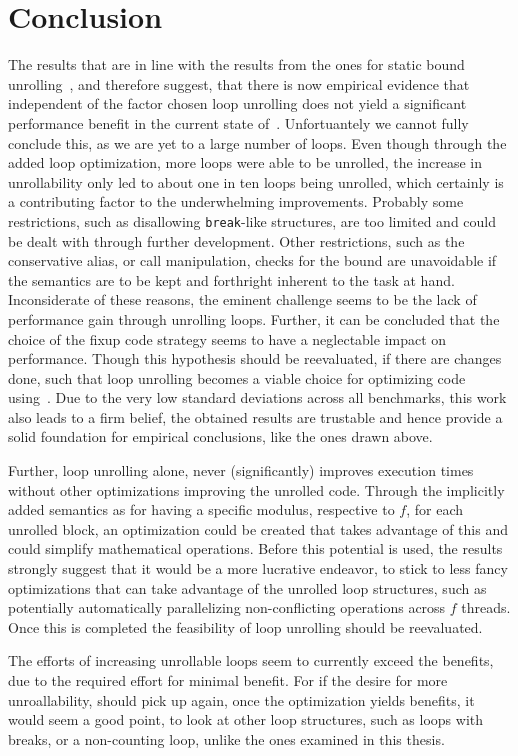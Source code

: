 \chapter{Conclusion}\label{sec:conclusion}

The results that are in line with the results from the ones for static bound unrolling~\cite{aebi18bachelorarbeit}, and therefore suggest, that there is now empirical evidence that independent of the factor chosen loop unrolling does not yield a significant performance benefit in the current state of~\libFIRM.
Unfortuantely we cannot fully conclude this, as we are yet to a large number of loops.
Even though through the added loop optimization, more loops were able to be unrolled, the increase in unrollability only led to about one in ten loops being unrolled, which certainly is a contributing factor to the underwhelming improvements.
Probably some restrictions, such as disallowing \texttt{break}-like structures, are too limited and could be dealt with through further development.
Other restrictions, such as the conservative alias, or call manipulation, checks for the bound are unavoidable if the semantics are to be kept and forthright inherent to the task at hand.
Inconsiderate of these reasons, the eminent challenge seems to be the lack of performance gain through unrolling loops.
Further, it can be concluded that the choice of the fixup code strategy seems to have a neglectable impact on performance.
Though this hypothesis should be reevaluated, if there are changes done, such that loop unrolling becomes a viable choice for optimizing code using~\libFIRM.
Due to the very low standard deviations across all benchmarks, this work also leads to a firm belief, the obtained results are trustable and hence provide a solid foundation for empirical conclusions, like the ones drawn above.

Further, loop unrolling alone, never (significantly) improves execution times without other optimizations improving the unrolled code.
Through the implicitly added semantics as for having a specific modulus, respective to $f$, for each unrolled block, an optimization could be created that takes advantage of this and could simplify mathematical operations.
Before this potential is used, the results strongly suggest that it would be a more lucrative endeavor, to stick to less fancy optimizations that can take advantage of the unrolled loop structures, such as potentially automatically parallelizing non-conflicting operations across $f$ threads.
Once this is completed the feasibility of loop unrolling should be reevaluated.

The efforts of increasing unrollable loops seem to currently exceed the benefits, due to the required effort for minimal benefit.
For if the desire for more unroallability, should pick up again, once the optimization yields benefits, it would seem a good point, to look at other loop structures, such as loops with breaks, or a non-counting loop, unlike the ones examined in this thesis.
